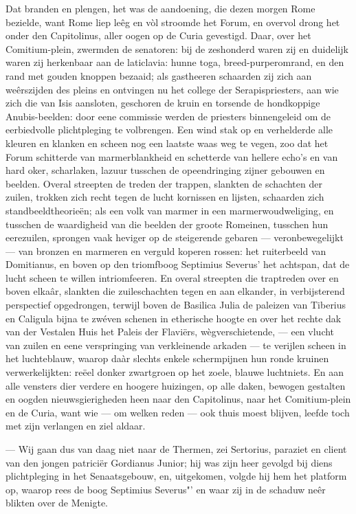 \documentclass[a4paper, 12pt, oneside, dutch]{article}
\begin{document}
Dat branden en plengen, het was de aandoening, die dezen morgen Rome bezielde, want Rome liep leêg en vòl stroomde het Forum, en overvol drong het onder den Capitolinus, aller oogen op de Curia gevestigd. Daar, over het Comitium-plein, zwermden de senatoren: bij de zeshonderd waren zij en duidelijk waren zij herkenbaar aan de laticlavia: hunne toga, breed-purperomrand, en den rand met gouden knoppen bezaaid; als gastheeren schaarden zij zich aan weêrszijden des pleins en ontvingen nu het college der Serapispriesters, aan wie zich die van Isis aansloten, geschoren de kruin en torsende de hondkoppige Anubis-beelden: door eene commissie werden de priesters binnengeleid om de eerbiedvolle plichtpleging te volbrengen. Een wind stak op en verhelderde alle kleuren en klanken en scheen nog een laatste waas weg te vegen, zoo dat het Forum schitterde van marmerblankheid en schetterde van hellere echo's en van hard oker, scharlaken, lazuur tusschen de opeendringing zijner gebouwen en beelden. Overal streepten de treden der trappen, slankten de schachten der zuilen, trokken zich recht tegen de lucht kornissen en lijsten, schaarden zich standbeeldtheorieën; als een volk van marmer in een marmerwoudweliging, en tusschen de waardigheid van die beelden der groote Romeinen, tusschen hun eerezuilen, sprongen vaak heviger op de steigerende gebaren --- veronbewegelijkt --- van bronzen en marmeren en verguld koperen rossen: het ruiterbeeld van Domitianus, en boven op den triomfboog Septimius Severus' het achtspan, dat de lucht scheen te willen intriomfeeren. En overal streepten die traptreden over en boven elkaâr, slankten die zuileschachten tegen en aan elkander, in verbijsterend perspectief opgedrongen, terwijl boven de Basilica Julia de paleizen van Tiberius en Caligula bijna te zwéven schenen in etherische hoogte en over het rechte dak van der Vestalen Huis het Paleis der Flaviërs, wègverschietende, --- een vlucht van zuilen en eene verspringing van verkleinende arkaden --- te verijlen scheen in het luchteblauw, waarop daàr slechts enkele schermpijnen hun ronde kruinen verwerkelijkten: reëel donker zwartgroen op het zoele, blauwe luchtniets. En aan alle vensters dier verdere en hoogere huizingen, op alle daken, bewogen gestalten en oogden nieuwsgierigheden heen naar den Capitolinus, naar het Comitium-plein en de Curia, want wie --- om welken reden --- ook thuis moest blijven, leefde toch met zijn verlangen en ziel aldaar.

--- Wij gaan dus van daag niet naar de Thermen, zei Sertorius, paraziet en client van den jongen patriciër Gordianus Junior; hij was zijn heer gevolgd bij diens plichtpleging in het Senaatsgebouw, en, uitgekomen, volgde hij hem het platform op, waarop rees de boog Septimius Severus"' en waar zij in de schaduw neêr blikten over de Menigte.
\end{document}
